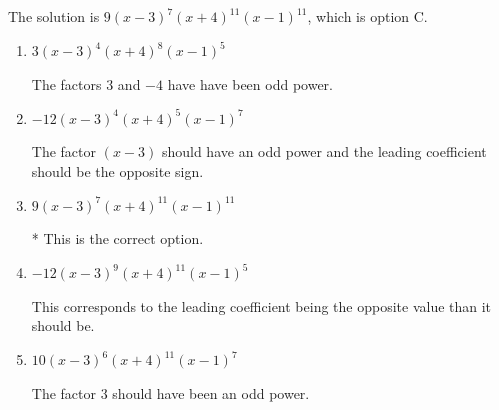 \documentclass{extbook}[14pt]
\begin{document}
\begin{enumerate}
{The solution is \( 9(x - 3)^{7} (x + 4)^{11} (x - 1)^{11} \), which is option C.\begin{enumerate}[label=\Alph*.]
\item \( 3(x - 3)^{4} (x + 4)^{8} (x - 1)^{5} \)

The factors $3$ and $-4$ have have been odd power.
\item \( -12(x - 3)^{4} (x + 4)^{5} (x - 1)^{7} \)

The factor $(x - 3)$ should have an odd power and the leading coefficient should be the opposite sign.
\item \( 9(x - 3)^{7} (x + 4)^{11} (x - 1)^{11} \)

* This is the correct option.
\item \( -12(x - 3)^{9} (x + 4)^{11} (x - 1)^{5} \)

This corresponds to the leading coefficient being the opposite value than it should be.
\item \( 10(x - 3)^{6} (x + 4)^{11} (x - 1)^{7} \)

The factor $3$ should have been an odd power.
\end{enumerate}

}
\end{enumerate}
\end{document}
